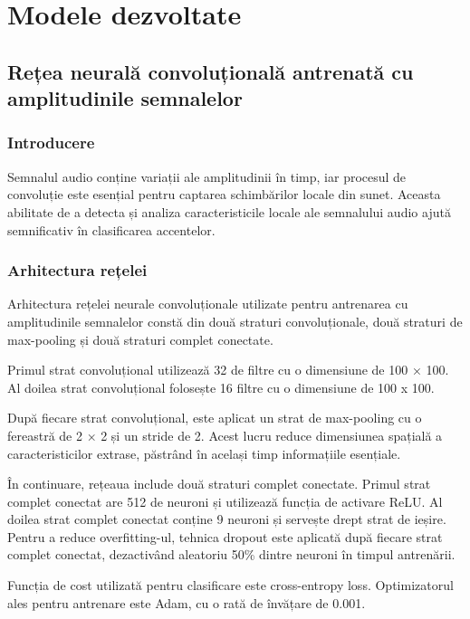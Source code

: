 \chapter{Modele dezvoltate}


\section{Rețea neurală convoluțională antrenată cu amplitudinile semnalelor}

\subsection{Introducere}

Semnalul audio conține variații ale amplitudinii în timp, iar procesul de convoluție este esențial pentru captarea schimbărilor locale din sunet. Aceasta abilitate de a detecta și analiza caracteristicile locale ale semnalului audio ajută semnificativ în clasificarea accentelor.
 

\subsection{Arhitectura rețelei}

Arhitectura rețelei neurale convoluționale utilizate pentru antrenarea cu amplitudinile semnalelor constă din două straturi convoluționale, două straturi de max-pooling și două straturi complet conectate. 

Primul strat convoluțional utilizează 32 de filtre cu o dimensiune de 100 × 100. Al doilea strat convoluțional folosește 16 filtre cu o dimensiune de 100 x 100.

După fiecare strat convoluțional, este aplicat un strat de max-pooling cu o fereastră de 
2 × 2 și un stride de 2. Acest lucru reduce dimensiunea spațială a caracteristicilor extrase, păstrând în același timp informațiile esențiale.

În continuare, rețeaua include două straturi complet conectate. Primul strat complet conectat are 512 de neuroni și utilizează funcția de activare ReLU. Al doilea strat complet conectat conține 9 neuroni și servește drept strat de ieșire. Pentru a reduce overfitting-ul, tehnica dropout este aplicată după fiecare strat complet conectat, dezactivând aleatoriu 50\% dintre neuroni în timpul antrenării.

Funcția de cost utilizată pentru clasificare este cross-entropy loss. Optimizatorul ales pentru antrenare este Adam, cu o rată de învățare de 0.001.


